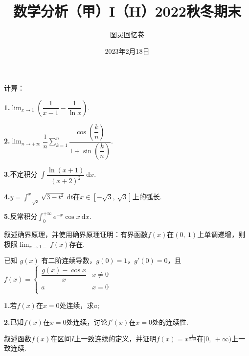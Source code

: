 \documentclass[UTF8,14pt,normal]{ctexart}
\title{\bf 数学分析（甲）I（H）2022秋冬期末}
\author{图灵回忆卷}
\date{2023年2月18日}
\begin{document}
    \maketitle 
    
    计算：\vspace{1em}

    \textbf{1.}$\displaystyle\lim_{x \to 1}(\dfrac{1}{x -1 } - \dfrac{1}{\ln x})$.\vspace{1em}

    \textbf{2.}$\displaystyle\lim_{n \to +\infty}\dfrac{1}{n}\sum_{k=1}^n \dfrac{\cos(\dfrac kn)}{1 + \sin(\dfrac kn)}$.\vspace{1em}

    \textbf{3.}不定积分 $\displaystyle\int \dfrac{\ln(x + 1)}{(x + 2) ^ 2}\ \mathrm dx$.\vspace{1em}

    \textbf{4.}$y=\displaystyle\int_{-\sqrt3}^x\sqrt{3 - t^2}\ \mathrm dt$在$x \in [-\sqrt3,\ \sqrt3]$上的弧长.\vspace{1em}

    \textbf{5.}反常积分$\displaystyle\int_{0}^{+\infty}e^{-x}\cos x\ \mathrm dx$.\vspace{1em}

    叙述确界原理，并使用确界原理证明：有界函数$f(x)$在$(0,\ 1)$上单调递增，则极限$\displaystyle\lim_{x \to 1-} f(x)$存在.\vspace{0.5em}

    已知 $g(x)$ 有二阶连续导数，$g(0) = 1$，$g'(0)=0$，且 $f(x) = \begin{cases}\dfrac{g(x) - \cos x}{x}&x \neq 0\\a&x=0\\\end{cases}$
    
    \textbf{1.}若$f(x)$在$x=0$处连续，求$a$;

    \textbf{2.}已知$f(x)$在$x=0$处连续，讨论$f'(x)$在$x=0$处的连续性.\vspace{0.5em}

    叙述函数$f(x)$在区间$I$上一致连续的定义，并证明$f(x)=x^{\frac{1}{2023}}$在$[0,\ +\infty)$上一致连续.\vspace{0.5em}
    
\end{document}
